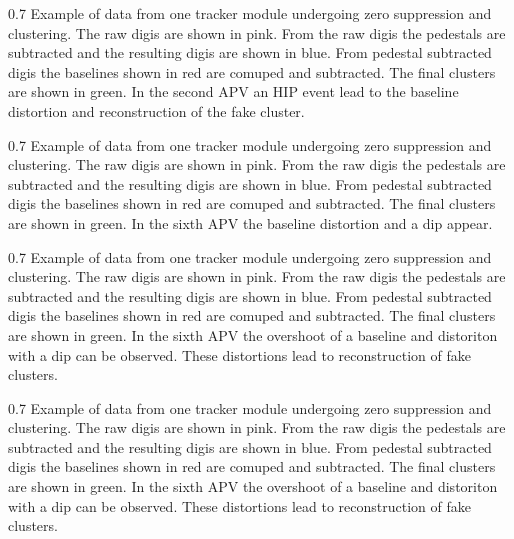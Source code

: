                  {0.7}       %
                 {Example of data from one tracker module undergoing zero suppression and clustering. The raw digis are shown in pink. From the raw digis the pedestals are subtracted and the resulting digis are shown in blue. From pedestal subtracted digis the baselines shown in red are comuped and subtracted. The final clusters are shown in green. In the second APV an HIP event lead to the baseline distortion and reconstruction of the fake cluster.} %

                 {0.7}       %
                 {Example of data from one tracker module undergoing zero suppression and clustering. The raw digis are shown in pink. From the raw digis the pedestals are subtracted and the resulting digis are shown in blue. From pedestal subtracted digis the baselines shown in red are comuped and subtracted. The final clusters are shown in green. In the sixth APV the baseline distortion and a dip appear.} %


                 {0.7}       %
                 {Example of data from one tracker module undergoing zero suppression and clustering. The raw digis are shown in pink. From the raw digis the pedestals are subtracted and the resulting digis are shown in blue. From pedestal subtracted digis the baselines shown in red are comuped and subtracted. The final clusters are shown in green. In the sixth APV the overshoot of a baseline and distoriton with a dip can be observed. These distortions lead to reconstruction of fake clusters.} %


                 {0.7}       %
                 {Example of data from one tracker module undergoing zero suppression and clustering. The raw digis are shown in pink. From the raw digis the pedestals are subtracted and the resulting digis are shown in blue. From pedestal subtracted digis the baselines shown in red are comuped and subtracted. The final clusters are shown in green. In the sixth APV the overshoot of a baseline and distoriton with a dip can be observed. These distortions lead to reconstruction of fake clusters.} %


